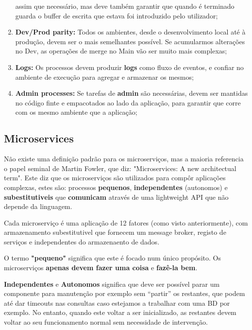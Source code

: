 \documentclass{article}
\begin{document}
\begin{enumerate}
  assim que necessário, mas deve também garantir que quando é terminado guarda o buffer de escrita que
  estava foi introduzido pelo utilizador;
  \item \textbf{Dev/Prod parity:} Todos os ambientes, desde o desenvolvimento
  local até à produção, devem ser o mais semelhantes possível.
  Se acumularmos alterações no Dev, as operações de merge no Main vão ser muito mais complexas;
  \item \textbf{Logs:} Os processos devem produzir \textbf{logs}
  como fluxo de eventos, e confiar no ambiente de execução para
  agregar e armazenar os mesmos;
  \item \textbf{Admin processes:} Se tarefas de \textbf{admin} são necessárias,
  devem ser mantidas no código finte e empacotados ao lado da aplicação,
  para garantir que corre com os mesmo ambiente que a aplicação;
\end{enumerate}

\subsection{Microservices}

Não existe uma definição padrão para os microserviços, mas
a maioria referencia o papel seminal de Martin Fowler, que
diz: "Microservices: A new architectual term".
Este diz que os microserviços são utilizados para compôr
aplicações complexas, estes são: processos \textbf{pequenos}, \textbf{independentes}
(autonomos) e \textbf{subestitutiveis} que \textbf{comunicam}
através de uma lightweight API que não depende da linguagem.

Cada microserviço é uma aplicação de 12 fatores (como visto anteriormente),
com armazenamento subestitutivel que fornecem um message broker,
registo de serviços e independentes do armazenaento de dados.

\vspace{2mm}

O termo \textbf{"pequeno"} significa que este é focado num único
propósito. Os microserviços \textbf{apenas devem fazer uma coisa}
e \textbf{fazê-la bem}.

\vspace{2mm}

\textbf{Independentes} e \textbf{Autonomos} significa que deve ser possível parar um componente para manutenção por exemplo sem “partir” os
restantes, que podem até dar timeouts nas consultas caso estejamos a trabalhar com uma BD por exemplo. No entanto,
quando este voltar a ser inicializado, as restantes devem voltar ao seu funcionamento normal sem necessidade de
intervenção.
\end{document}
